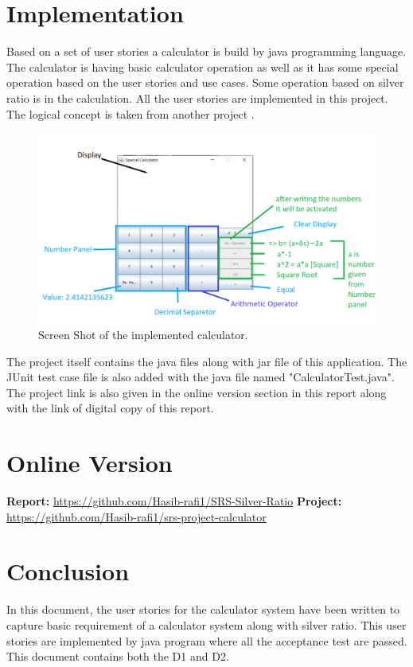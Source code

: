\documentclass{article}
\begin{document}
\section{Implementation}
Based on a set of user stories a calculator is build by java programming language. The calculator is having basic calculator operation as well as  it has some special operation based on the user stories and use cases. Some operation based on silver ratio is in the calculation. All the user stories are implemented in this project. The logical concept is taken from another project \cite{cal_project}.
\begin{figure}[!htb]
 \centering
  \includegraphics[width=1\textwidth]{project}
  \caption{Screen Shot of the implemented calculator.}
\end{figure}

The project itself contains the java files along with jar file of this application. The JUnit test case file is also added with the java file named "CalculatorTest.java". The project link is also given in the online version section in this report along with the link of digital copy of this report. 
\section{Online Version}
\textbf{Report:} \url{https://github.com/Hasib-rafi1/SRS-Silver-Ratio}
\newline
\textbf{Project:} \url{https://github.com/Hasib-rafi1/srs-project-calculator}\newline

\section{Conclusion}
In this document, the user stories for the calculator system have been written to capture basic requirement of a calculator system along with silver ratio. This user stories are implemented by java program where all the acceptance test are passed. This document contains both the D1 and D2. 
\printbibliography
\end{document}
